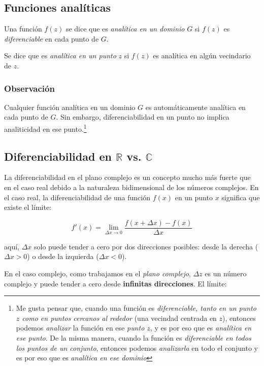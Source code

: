\documentclass[10pt,a4paper]{book}
\begin{document}
\subsection{Funciones analíticas}

Una función $f(z)$ se dice que es \textit{analítica en un dominio} $G$ si $f(z)$ es \textit{diferenciable} en cada punto de $G$. 

Se dice que es \textit{analítica en un punto} $z$ si $f(z)$ es analítica en algún vecindario de $z$. 

\subsubsection*{Observación}
Cualquier función analítica en un dominio $G$ es automáticamente analítica en cada punto de $G$. Sin embargo, diferenciabilidad en un punto no implica analiticidad en ese punto.\footnote{Me gusta pensar que, cuando una función es \textit{diferenciable, tanto en un punto $z$ como en puntos cercanos al rededor} (una vecindad centrada en $z$), entonces podemos \textit{analizar} la función en ese \textit{punto $z$}, y es por eso que es \textit{analítica en ese punto}. De la misma manera, cuando la función es \textit{diferenciable en todos los puntos de un conjunto}, entonces podemos \textit{analizarla} en todo el conjunto y es por eso que es \textit{analítica en ese dominio} }

\subsection{Diferenciabilidad en \( \mathbb{R} \) vs. \( \mathbb{C} \)}

La diferenciabilidad en el plano complejo es un concepto mucho más fuerte que en el caso real debido a la naturaleza bidimensional de los números complejos. En el caso real, la diferenciabilidad de una función $ f(x) $ en un punto $ x $ significa que existe el límite:

\begin{equation}
    f'(x) = \lim_{\Delta x \to 0} \frac{f(x + \Delta x) - f(x)}{\Delta x}
\end{equation}

aquí, $ \Delta x $ solo puede tender a cero por dos direcciones posibles: desde la derecha ($ \Delta x > 0 $) o desde la izquierda ($ \Delta x < 0 $).  

En el caso complejo, como trabajamos en el \textit{plano complejo}, $ \Delta z $ es un número complejo y puede tender a cero desde \textbf{infinitas direcciones}. El límite:
\end{document}
